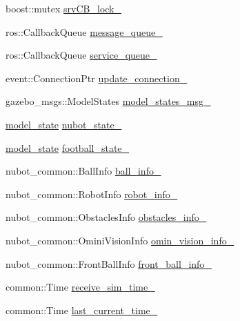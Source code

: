 \begin{DoxyCompactItemize}
\item 
boost\-::mutex \hyperlink{classgazebo_1_1NubotGazebo_a6b3d2a253732eedfcf18e0223435bed0}{srv\-C\-B\-\_\-lock\-\_\-}
\item 
ros\-::\-Callback\-Queue \hyperlink{classgazebo_1_1NubotGazebo_a7186c914f81602db7bd347b940794bbf}{message\-\_\-queue\-\_\-}
\item 
ros\-::\-Callback\-Queue \hyperlink{classgazebo_1_1NubotGazebo_ae1fe2dc1962659f70ebba9555a92e59a}{service\-\_\-queue\-\_\-}
\item 
event\-::\-Connection\-Ptr \hyperlink{classgazebo_1_1NubotGazebo_a4e3b8b74aa075427ecbd5c82f630144d}{update\-\_\-connection\-\_\-}
\item 
gazebo\-\_\-msgs\-::\-Model\-States \hyperlink{classgazebo_1_1NubotGazebo_a320dc212fab523958abb529f946133bd}{model\-\_\-states\-\_\-msg\-\_\-}
\item 
\hyperlink{structgazebo_1_1model__state}{model\-\_\-state} \hyperlink{classgazebo_1_1NubotGazebo_a5abf5be34d8441db05d94ead7924ce14}{nubot\-\_\-state\-\_\-}
\item 
\hyperlink{structgazebo_1_1model__state}{model\-\_\-state} \hyperlink{classgazebo_1_1NubotGazebo_af7356a83d30997d884440a10e95d29f4}{football\-\_\-state\-\_\-}
\item 
nubot\-\_\-common\-::\-Ball\-Info \hyperlink{classgazebo_1_1NubotGazebo_a69c9083b620e0914c1e05c491a72dee1}{ball\-\_\-info\-\_\-}
\item 
nubot\-\_\-common\-::\-Robot\-Info \hyperlink{classgazebo_1_1NubotGazebo_a0b6c40da9694bc5645ea4abd0ee6825c}{robot\-\_\-info\-\_\-}
\item 
nubot\-\_\-common\-::\-Obstacles\-Info \hyperlink{classgazebo_1_1NubotGazebo_a99a7b4ea5d236921e8851f9e1fada285}{obstacles\-\_\-info\-\_\-}
\item 
nubot\-\_\-common\-::\-Omini\-Vision\-Info \hyperlink{classgazebo_1_1NubotGazebo_a61aa65532963d60511bd5b7cf6d2e2cf}{omin\-\_\-vision\-\_\-info\-\_\-}
\item 
nubot\-\_\-common\-::\-Front\-Ball\-Info \hyperlink{classgazebo_1_1NubotGazebo_a7583d7ea785ceae0a6e9126c743c9c3b}{front\-\_\-ball\-\_\-info\-\_\-}
\item 
common\-::\-Time \hyperlink{classgazebo_1_1NubotGazebo_a36186a24f60f3c88fd6fb12fd85b4fa4}{receive\-\_\-sim\-\_\-time\-\_\-}
\item 
common\-::\-Time \hyperlink{classgazebo_1_1NubotGazebo_a8e05ad53365765db200e0d62c451e069}{last\-\_\-current\-\_\-time\-\_\-}
\item 

\end{DoxyCompactItemize}
